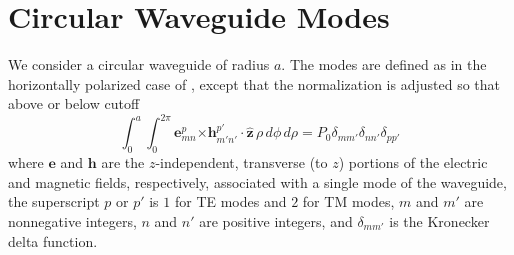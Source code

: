 \documentclass[11pt]{article}
\newcommand{\z}{\boldsymbol{\hat{z}}}
\newcommand{\cross}{\boldsymbol{\times}}
\newcommand{\e}{\boldsymbol{e}}
\newcommand{\h}{\boldsymbol{h}}
\begin{document}
\appendix

\section{Circular Waveguide Modes}
\label{app:modes}
We consider a circular waveguide of radius $a$.
The modes are defined as in the horizontally polarized case of
\cite[pp.\ 66--72]{marc:64},  except that the normalization is
adjusted so that above or below cutoff 
\begin{equation}
  \int_0^a \int_0^{2\pi} \e^{p}_{mn} \cross \h^{p'}_{m'n'} \cdot \z \, \rho \,
   d\phi \, d\rho = P_0 \delta_{mm'}\delta_{nn'}\delta_{pp'} \label{eq:normalization}
\end{equation}
where $\e$ and $\h$ are the $z$-independent, transverse (to $z$) 
portions of the electric
and magnetic fields, respectively, associated with a single mode of the
waveguide, the superscript $p$ or $p'$ is $1$ for TE modes and $2$ for
TM modes, $m$ and $m'$ are nonnegative integers, $n$ and $n'$ are
positive integers, and $\delta_{mm'}$ is the Kronecker delta function.
\end{document}
